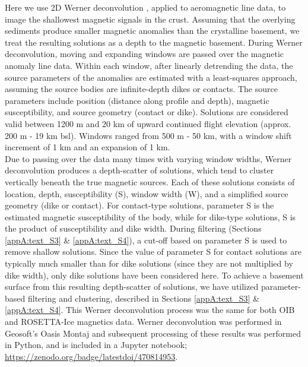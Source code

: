 Here we use 2D Werner deconvolution \citet{wernerinterpretation1953}, applied to aeromagnetic line data, to image the shallowest magnetic signals in the crust. Assuming that the overlying sediments produce smaller magnetic anomalies than the crystalline basement, we treat the resulting solutions as a depth to the magnetic basement. During Werner deconvolution, moving and expanding windows are passed over the magnetic anomaly line data. Within each window, after linearly detrending the data, the source parameters of the anomalies are estimated with a least-squares approach, assuming the source bodies are infinite-depth dikes or contacts. The source parameters include position (distance along profile and depth), magnetic susceptibility, and source geometry (contact or dike). Solutions are considered valid between 1200 m and 20 km of upward continued flight elevation (approx. 200 m - 19 km bsl). Windows ranged from 500 m - 50 km, with a window shift increment of 1 km and an expansion of 1 km.\\

Due to passing over the data many times with varying window widths, Werner deconvolution produces a depth-scatter of solutions, which tend to cluster vertically beneath the true magnetic sources. Each of these solutions consists of location, depth, susceptibility (S), window width (W), and a simplified source geometry (dike or contact). For contact-type solutions, parameter S is the estimated magnetic susceptibility of the body, while for dike-type solutions, S is the product of susceptibility and dike width. During filtering (Sections \ref{appA:text_S3} \& \ref{appA:text_S4}), a cut-off based on parameter S is used to remove shallow solutions. Since the value of parameter S for contact solutions are typically much smaller than for dike solutions (since they are not multiplied by dike width), only dike solutions have been considered here. To achieve a basement surface from this resulting depth-scatter of solutions, we have utilized parameter-based filtering and clustering, described in Sections \ref{appA:text_S3} \& \ref{appA:text_S4}. This Werner deconvolution process was the same for both OIB and ROSETTA-Ice magnetics data. Werner deconvolution was performed in Geosoft’s Oasis Montaj and subsequent processing of these results was performed in Python, and is included in a Jupyter notebook; \url{https://zenodo.org/badge/latestdoi/470814953}.\\

